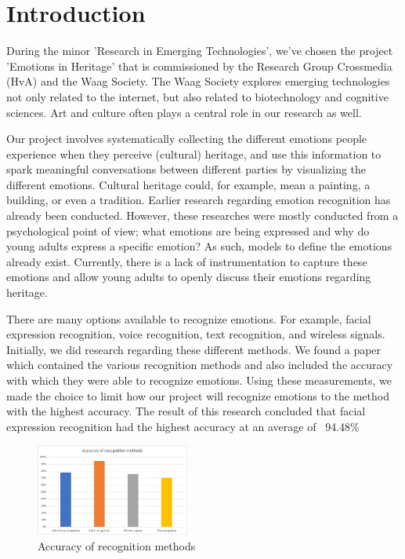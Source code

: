 \documentclass[sigconf]{acmart}
\begin{document}

\section{Introduction}
During the minor 'Research in Emerging Technologies', we've chosen the project 'Emotions in Heritage' that
is commissioned by the Research Group Crossmedia (HvA) and the Waag Society. The Waag Society explores
emerging technologies not only related to the internet, but also related to biotechnology and cognitive sciences.
Art and culture often plays a central role in our research as well.

Our project involves systematically collecting the different emotions people experience when they perceive
(cultural) heritage, and use this information to spark meaningful conversations between different parties
by visualizing the different emotions. Cultural heritage could, for example, mean a painting, a building, or
even a tradition. Earlier research regarding emotion recognition has already been conducted. However, these
researches were mostly conducted from a psychological point of view; what emotions are being expressed
and why do young adults express a specific emotion? As such, models to define the emotions already exist.
Currently, there is a lack of instrumentation to capture these emotions and allow young adults to openly discuss
their emotions regarding heritage.

There are many options available to recognize emotions. For example, facial expression recognition, voice
recognition, text recognition, and wireless signals. Initially, we did research regarding these different
methods. We found a paper \cite{den2005facereader} which contained the various recognition methods and also included
the accuracy with which they were able to recognize emotions. Using these measurements, we made the choice to
limit how our project will recognize emotions to the method with the highest accuracy. The result of this
research concluded that facial expression recognition had the highest accuracy at an average of ~94.48\%
\begin{figure}[h]
    \centering
    \includegraphics[width=0.45\textwidth, scale=1]{emotion_recognition_accuracy.jpg}
    \caption{Accuracy of recognition methods}
\end{figure}
\end{document}
